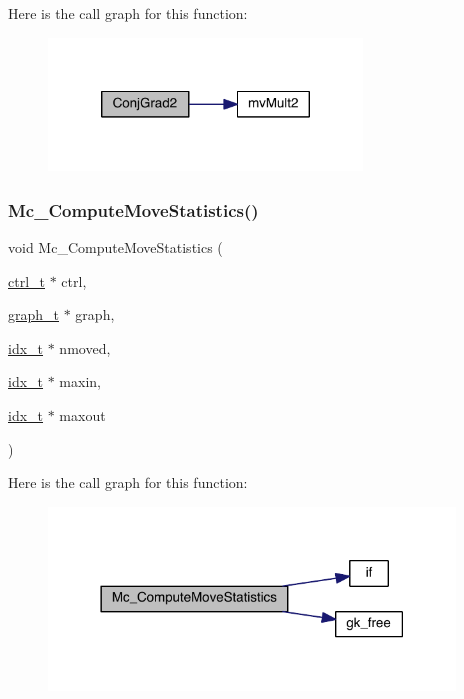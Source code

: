 Here is the call graph for this function\+:\nopagebreak
\begin{figure}[H]
\begin{center}
\leavevmode
\includegraphics[width=236pt]{a00353_a31c811c3b724d9d26416be8831be44e0_cgraph}
\end{center}
\end{figure}
\mbox{\label{a00353_a007901e980318b5c455c6798c5686fc4}} 
\subsubsection{\texorpdfstring{Mc\+\_\+\+Compute\+Move\+Statistics()}{Mc\_ComputeMoveStatistics()}}
{\footnotesize\ttfamily void Mc\+\_\+\+Compute\+Move\+Statistics (\begin{DoxyParamCaption}\item[{\hyperlink{a00742}{ctrl\+\_\+t} $\ast$}]{ctrl,  }\item[{\hyperlink{a00734}{graph\+\_\+t} $\ast$}]{graph,  }\item[{\hyperlink{a00876_aaa5262be3e700770163401acb0150f52}{idx\+\_\+t} $\ast$}]{nmoved,  }\item[{\hyperlink{a00876_aaa5262be3e700770163401acb0150f52}{idx\+\_\+t} $\ast$}]{maxin,  }\item[{\hyperlink{a00876_aaa5262be3e700770163401acb0150f52}{idx\+\_\+t} $\ast$}]{maxout }\end{DoxyParamCaption})}

Here is the call graph for this function\+:\nopagebreak
\begin{figure}[H]
\begin{center}
\leavevmode
\includegraphics[width=306pt]{a00353_a007901e980318b5c455c6798c5686fc4_cgraph}
\end{center}
\end{figure}
\mbox{\label{a00353_ac2a70991745acc003b806be26e3a8124}} 
